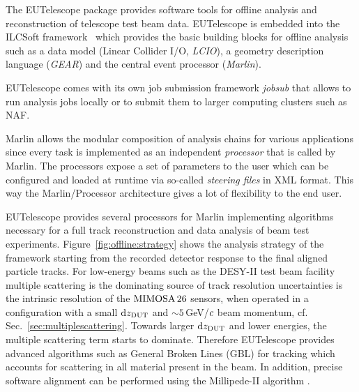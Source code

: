 

The EUTelescope package \cite{ref:eutelwebsite} provides software tools for offline analysis and reconstruction of telescope test beam data. 
EUTelescope is embedded into the ILCSoft framework~\cite{ref:eudetmemo_2009_12} which provides the basic building blocks for offline analysis such as a data model (Linear Collider I/O, \emph{LCIO}),
a geometry description language (\emph{GEAR}) and the central event processor (\emph{Marlin}).


EUTelescope comes with its own job submission framework \emph{jobsub} that allows to run analysis jobs locally or to submit them to larger computing clusters such as NAF.

Marlin allows the modular composition of analysis chains for various applications since every task is implemented as an independent \emph{processor} that is called by Marlin. 
The processors expose a set of parameters to the user which can be configured and loaded at runtime via so-called \emph{steering files} in XML format.
This way the Marlin/Processor architecture gives a lot of flexibility to the end user. 

EUTelescope provides several processors for Marlin implementing algorithms necessary for a full track reconstruction and data analysis of beam test experiments. 
Figure~\ref{fig:offline:strategy} shows the analysis strategy of the framework starting from the recorded detector response to the final aligned particle tracks. 
For low-energy beams such as the DESY-II test beam facility multiple scattering is the dominating source of track resolution uncertainties is
 the intrinsic resolution of the $\textrm{MIMOSA\,26}$ sensors, when operated in a configuration with a small $\textrm{d}z_{\textrm{DUT}}$ and $\sim 5$\,GeV/$\mathnormal{c}$ beam momentum, cf.\,Sec.~\ref{sec:multiplescattering}.
Towards larger $\textrm{d}z_{\textrm{DUT}}$ and lower energies, the multiple scattering term starts to dominate.
Therefore EUTelescope provides advanced algorithms such as General Broken Lines (GBL) \cite{Kleinwort-2012} for tracking which accounts for scattering in all material present in the beam. 
In addition, precise software alignment can be performed using the Millipede-II algorithm \cite{Blobel-2006}.

